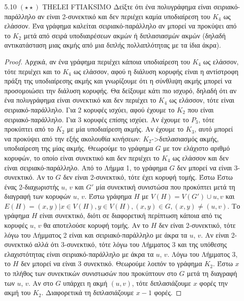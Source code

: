 \documentclass[a4paper, oneside, 11pt]{article}
\begin{document}
\begin{enumerate}
\begin{proof}
      \[ d(u_1)\cdot1 + d(u_2)\cdot2 + \ldots + d(u_n)\cdot1
         \leq (d^2(u_1) + \ldots + d^2(u_n)) \cdot (1 + \ldots + 1)
         = (d^2(u_1) + \ldots + d^2(u_n)) \cdot n \]

      \end{proof}

   \item[5.10 $(\star \star)$]
THELEI FTIAKSIMO
Δείξτε ότι ένα πολυγράφημα είναι σειριακό-παράλληλο αν είναι 2-συνεκτικό και δεν περιέχει καμία υποδιαίρεση του $K_4$ ως ελάσσον. Ένα γράφημα καλείται σειριακό-παράλληλο αν μπορεί
να προκύψει από το $K_2$ μετά από σειρά υποδιαιρέσεων ακμών ή διπλασιασμών ακμών (δηλαδή αντικατάσταση μιας ακμής από μια διπλής πολλαπλότητας με τα ίδια άκρα).
	\begin{proof}
Αρχικά, αν ένα γράφημα περιέχει κάποια υποδιαίρεση του $K_4$ ως ελάσσον, τότε περιέχει και το $K_4$ ως ελάσσον, αφού η διάλυση κορυφής είναι η αντίστροφη πράξη της υποδιαίρεσης ακμής και γνωρίζουμε
ότι η σύνθλιψη ακμής μπορεί να προσομοιώσει την διάλυση κορυφής.
Θα δείξουμε κάτι πιο ισχυρό, δηλαδή ότι αν ένα πολυγράφημα είναι συνεκτικό και δεν περιέχει το $K_4$ ως ελάσσον, τότε είναι σειριακό-παράλληλο.
Για 2 κορυφές ισχύει, αφού έχουμε το $K_2$ που είναι σειριακό-παράλληλο.
Για 3 κορυφές επίσης ισχύει. Αν έχουμε το $P_3$, τότε προκύπτει από το $K_2$ με μία υποδιαίρεση ακμής. Αν έχουμε το $K_3$, αυτό μπορεί να προκύψει από την εξής ακολουθία κινήσεων: 
$K_2$->διπλασιασμός ακμής, υποδιαίρεση της μίας ακμής.
Θεωρούμε το γράφημα $G$ με τον ελάχιστο αριθμό κορυφών, το οποίο είναι συνεκτικό και δεν περιέχει το $K_4$ ως ελάσσον και δεν είναι σειριακό-παράλληλο. Από το Λήμμα 1, το γράφημα $G$ δεν μπορεί
να είναι 3-συνεκτικό. Αν το $G$ δεν είναι 2-συνεκτικό, τότε έχει κορυφή τομής. Έστω
Έστω ένας 2-διαχωριστής $u$, $v$ και $G'$ μία συνεκτική συνιστώσα που προκύπτει μετά τη διαγραφή των κορυφών $u$, $v$. Έστω γράφημα $H$ με 
$V(H)=V(G')\cup {u,v}$ και $E(H) = {(x,y) | x\in V(H), y\in V(H), (x,y)\in G, (x,y)\neq (u,v)}$. Το γράφημα $H$ είναι συνεκτικό, διότι σε διαφορετική περίπτωση κάποια από τις κορυφές 
$u$, $v$ θα αποτελούσε κορυφή τομής. Αν το $H$ δεν είναι 2-συνεκτικό, τότε λόγω του Λήμματος 2 είναι και σειριακό-παράλληλο με άκρα τα $u$, $v$. Αν είναι 2-συνεκτικό αλλά ότι 3-συνεκτικό, τότε 
λόγω του Λήμματος 3 
και της υπόθεσης ελαχιστότητας είναι σειριακό-παράλληλο με άκρα τα $u$, $v$. Λόγω του Λήμματος 3, το $H$ δεν μπορεί να είναι 3 συνεκτικό. Θεωρούμε λοιπόν το γράφημα $Κ_2$. Έστω $x$ το πλήθος των
συνεκτικών συνιστωσών που προκύπτουν στο $G$ μετά τη διαγραφή των $u$, $v$. Αν στο $G$ υπάρχει η ακμή $(u,v)$, τότε διπλασιάζουμε $x$ φορές την ακμή του $K_2$. Διαφορετικά τη διπλασιάζουμε $x-1$ φορές.

\end{proof}
\end{enumerate}
\end{document}
